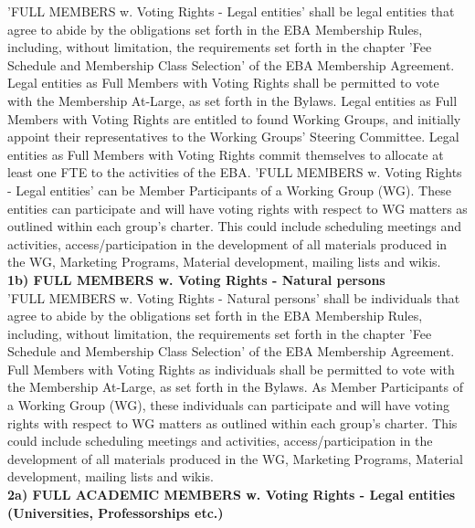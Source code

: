 \documentclass{article}
\begin{document}
'FULL MEMBERS w. Voting Rights - Legal entities' shall be legal entities that agree to abide by the obligations set forth in the EBA Membership Rules, including, without limitation, the requirements set forth in the chapter 'Fee Schedule and Membership Class Selection' of the EBA Membership Agreement. 
Legal entities as Full Members with Voting Rights shall be permitted to vote with the Membership At-Large, as set forth in the Bylaws. 
Legal entities as Full Members with Voting Rights are entitled to found Working Groups, and initially appoint their representatives to the Working Groups' Steering Committee. 
Legal entities as Full Members with Voting Rights commit themselves to allocate at least one FTE to the activities of the EBA. 
'FULL MEMBERS w. Voting Rights - Legal entities' can be Member Participants of a Working Group (WG). These entities can participate and will have voting rights with respect to WG matters as outlined within each group's charter. 
This could include scheduling meetings and activities, access/participation in the development of all materials produced in the WG, Marketing Programs, Material development, mailing lists and wikis. \\

\textbf{1b) FULL MEMBERS w. Voting Rights - Natural persons} \\

'FULL MEMBERS w. Voting Rights - Natural persons' shall be individuals that agree to abide by the obligations set forth in the EBA Membership Rules, including, without limitation, the requirements set forth in the chapter 'Fee Schedule and Membership Class Selection' of the EBA Membership Agreement. 
Full Members with Voting Rights as individuals shall be permitted to vote with the Membership At-Large, as set forth in the Bylaws. 
As Member Participants of a Working Group (WG), these individuals can participate and will have voting rights with respect to WG matters as outlined within each group's charter. 
This could include scheduling meetings and activities, access/participation in the development of all materials produced in the WG, Marketing Programs, Material development, mailing lists and wikis. \\

\textbf{2a) FULL ACADEMIC MEMBERS w. Voting Rights - Legal entities (Universities, Professorships etc.)}
\end{document}
